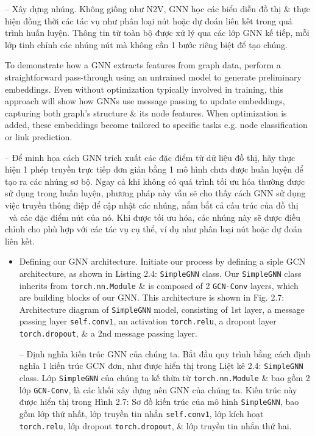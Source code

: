 \documentclass{article}
\begin{document}
\begin{itemize}
\begin{itemize}
\begin{itemize}
           -- {\sf Xây dựng nhúng.} Không giống như N2V, GNN học các biểu diễn đồ thị \& thực hiện đồng thời các tác vụ như phân loại nút hoặc dự đoán liên kết trong quá trình huấn luyện. Thông tin từ toàn bộ được xử lý qua các lớp GNN kế tiếp, mỗi lớp tinh chỉnh các nhúng nút mà không cần 1 bước riêng biệt để tạo chúng.

           To demonstrate how a GNN extracts features from graph data, perform a straightforward pass-through using an untrained model to generate preliminary embeddings. Even without optimization typically involved in training, this approach will show how GNNs use message passing to update embeddings, capturing both graph's structure \& its node features. When optimization is added, these embeddings become tailored to specific tasks e.g. node classification or link prediction.

           -- Để minh họa cách GNN trích xuất các đặc điểm từ dữ liệu đồ thị, hãy thực hiện 1 phép truyền trực tiếp đơn giản bằng 1 mô hình chưa được huấn luyện để tạo ra các nhúng sơ bộ. Ngay cả khi không có quá trình tối ưu hóa thường được sử dụng trong huấn luyện, phương pháp này vẫn sẽ cho thấy cách GNN sử dụng việc truyền thông điệp để cập nhật các nhúng, nắm bắt cả cấu trúc của đồ thị \ và các đặc điểm nút của nó. Khi được tối ưu hóa, các nhúng này sẽ được điều chỉnh cho phù hợp với các tác vụ cụ thể, ví dụ như phân loại nút hoặc dự đoán liên kết.
           \begin{itemize}
               \item {\sf Defining our GNN architecture.} Initiate our process by defining a siple GCN architecture, as shown in {\sf Listing 2.4: {\tt SimpleGNN} class}. Our {\tt SimpleGNN} class inherits from {\tt torch.nn.Module} \& is composed of 2 {\tt GCN-Conv} layers, which are building blocks of our GNN. This architecture is shown in {\sf Fig. 2.7: Architecture diagram of {\tt SimpleGNN} model}, consisting of 1st layer, a message passing layer {\tt self.conv1}, an activation {\tt torch.relu}, a dropout layer {\tt torch.dropout}, \& a 2nd message passing layer.

               -- {\sf Định nghĩa kiến trúc GNN của chúng ta.} Bắt đầu quy trình bằng cách định nghĩa 1 kiến trúc GCN đơn, như được hiển thị trong {\sf Liệt kê 2.4: {\tt SimpleGNN} class}. Lớp {\tt SimpleGNN} của chúng ta kế thừa từ {\tt torch.nn.Module} \& bao gồm 2 lớp {\tt GCN-Conv}, là các khối xây dựng nên GNN của chúng ta. Kiến trúc này được hiển thị trong {\sf Hình 2.7: Sơ đồ kiến trúc của mô hình {\tt SimpleGNN}}, bao gồm lớp thứ nhất, lớp truyền tin nhắn {\tt self.conv1}, lớp kích hoạt {\tt torch.relu}, lớp dropout {\tt torch.dropout}, \& lớp truyền tin nhắn thứ hai.


\end{itemize}
\end{itemize}
\end{itemize}
\end{itemize}
\end{document}
